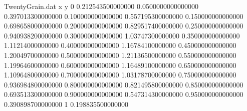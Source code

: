 \begin{filecontents}{TwentyGrain.dat}
x y
0	0.212543500000000
0.0500000000000000	0.397013300000000
0.100000000000000	0.557195300000000
0.150000000000000	0.698658000000000
0.200000000000000	0.829517400000000
0.250000000000000	0.940938200000000
0.300000000000000	1.03747300000000
0.350000000000000	1.11214000000000
0.400000000000000	1.16784100000000
0.450000000000000	1.20049700000000
0.500000000000000	1.21136500000000
0.550000000000000	1.19964600000000
0.600000000000000	1.16489100000000
0.650000000000000	1.10964800000000
0.700000000000000	1.03178700000000
0.750000000000000	0.936984800000000
0.800000000000000	0.821495800000000
0.850000000000000	0.693513300000000
0.900000000000000	0.547314300000000
0.950000000000000	0.390898700000000
1	0.198835500000000
\end{filecontents}

